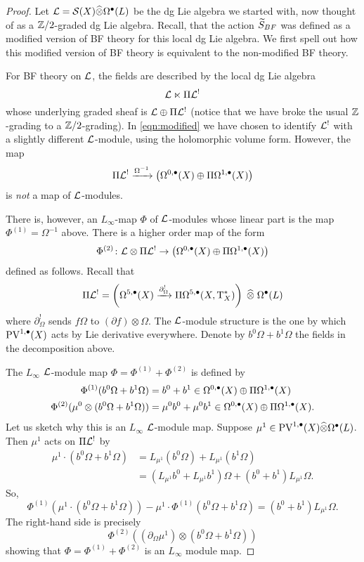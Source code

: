 \documentclass[11pt]{amsart}
\def\PV{{\rm PV}}
\def\T{{\rm T}}
\begin{document}
\begin{proof}
Let $\cL = \cS(X) \Hat{\otimes} \Omega^\bu(L)$ be the dg Lie algebra we started with, now thought of as a $\ZZ/2$-graded dg Lie algebra. 
Recall, that the action $\Tilde{S}_{BF}$ was defined as a modified version of BF theory for this local dg Lie algebra. 
We first spell out how this modified version of BF theory is equivalent to the non-modified BF theory.

For BF theory on $\cL$, the fields are described by the local dg Lie algebra
\[
\cL \ltimes \Pi \cL^!  
\]
whose underlying graded sheaf is $\cL \oplus \Pi \cL^!$ (notice that we have broke the usual $\ZZ$-grading to a $\ZZ/2$-grading). 
In \eqref{eqn:modified} we have chosen to identify $\cL^!$ with a slightly different $\cL$-module, using the holomorphic volume form. 
However, the map 
\[
\Pi \cL^!  \xto{\Omega^{-1}} \left(\Omega^{0,\bu}(X) \oplus \Pi \Omega^{1,\bu}(X)\right)
\]
is {\em not} a map of $\cL$-modules. 

There is, however, an $L_\infty$-map $\Phi$ of $\cL$-modules whose linear part is the map $\Phi^{(1)} = \Omega^{-1}$ above. 
There is a higher order map of the form
\[
\Phi^{(2)} \colon \cL \otimes \Pi \cL^! \to \left(\Omega^{0,\bu}(X) \oplus \Pi \Omega^{1,\bu}(X)\right)
\]
defined as follows. 
Recall that 
\[ 
\Pi \cL^! = \left(\Omega^{5, \bu}(X) \xto{\partial_\Omega^!} \Pi \Omega^{5,\bu} (X, \T^*_X) \right) \; \Hat{\otimes} \; \Omega^\bu(L) 
\]
where $\partial_\Omega^!$ sends $f \Omega$ to $(\partial f) \otimes \Omega$. 
The $\cL$-module structure is the one by which $\PV^{1,\bu}(X)$ acts by Lie derivative everywhere. 
Denote by $b^0 \Omega + b^1 \Omega$ the fields in the decomposition above. 

The $L_\infty$ $\cL$-module map $\Phi = \Phi^{(1)} + \Phi^{(2)}$ is defined by
\begin{align*}
\Phi^{(1)} (b^0 \Omega + b^1 \Omega) & = b^0 + b^1 \in \Omega^{0,\bu}(X) \oplus \Pi \Omega^{1,\bu}(X) \\
\Phi^{(2)} (\mu^0 \otimes (b^0\Omega + b^1\Omega)) & = \mu^0 b^0 + \mu^0 b^1 \in \Omega^{0,\bu}(X) \oplus \Pi \Omega^{1,\bu}(X) .
\end{align*}
Let us sketch why this is an $L_\infty$ $\cL$-module map.
Suppose $\mu^1 \in \PV^{1,\bu}(X) \Hat{\otimes} \Omega^\bu(L)$.
Then $\mu^1$ acts on $\Pi \cL^!$ by
\begin{align*}
\mu^1 \cdot (b^0 \Omega + b^1 \Omega) & = L_{\mu^1} (b^0 \Omega) + L_{\mu^1} (b^1 \Omega) \\ & = (L_{\mu^1} b^0 + L_{\mu^1} b^1) \Omega + (b^0 + b^1) L_{\mu^1} \Omega .
\end{align*}
So, 
\[
\Phi^{(1)} (\mu^1 \cdot (b^0 \Omega + b^1 \Omega)) - \mu^1 \cdot \Phi^{(1)} (b^0 \Omega + b^1 \Omega) = (b^0 + b^1) L_{\mu^1} \Omega .
\]
The right-hand side is precisely
\[
\Phi^{(2)} ((\partial_\Omega \mu^1) \otimes (b^0 \Omega + b^1 \Omega))
\]
showing that $\Phi = \Phi^{(1)} + \Phi^{(2)}$ is an $L_\infty$ module map.


\end{proof}
\end{document}
